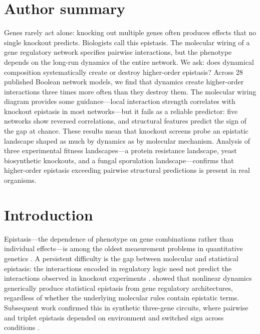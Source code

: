 \documentclass[10pt]{article}
\begin{document}
\section*{Author summary}
Genes rarely act alone: knocking out multiple genes often produces
effects that no single knockout predicts. Biologists call this epistasis.
The molecular wiring of a gene regulatory network specifies pairwise
interactions, but the phenotype depends on the long-run dynamics of the
entire network. We ask: does dynamical composition systematically create
or destroy higher-order epistasis? Across 28 published Boolean network
models, we find that dynamics create higher-order interactions three
times more often than they destroy them. The molecular wiring diagram
provides some guidance---local interaction strength correlates with
knockout epistasis in most networks---but it fails as a reliable
predictor: five networks show reversed correlations, and structural
features predict the sign of the gap at chance. These results mean
that knockout screens probe an epistatic landscape shaped as much by
dynamics as by molecular mechanism. Analysis of three experimental
fitness landscapes---a protein resistance landscape, yeast
biosynthetic knockouts, and a fungal sporulation landscape---confirms
that higher-order epistasis exceeding pairwise structural predictions
is present in real organisms.


\section{Introduction}
\label{sec:intro}

Epistasis---the dependence of phenotype on gene combinations rather
than individual effects---is among the oldest measurement problems in
quantitative genetics \citep{fisher1918correlation, bateson1909heredity}. A
persistent difficulty is the gap between molecular and statistical
epistasis: the interactions encoded in regulatory logic need not
predict the interactions observed in knockout experiments
\citep{phillips2008epistasis}. \citet{gjuvsland2007statistical} showed
that nonlinear dynamics generically produce statistical epistasis from
gene regulatory architectures, regardless of whether the underlying
molecular rules contain epistatic terms. Subsequent work confirmed this in synthetic three-gene
circuits, where pairwise and triplet epistasis depended on environment
and switched sign across conditions \citep{baier2023environment}.
\end{document}
